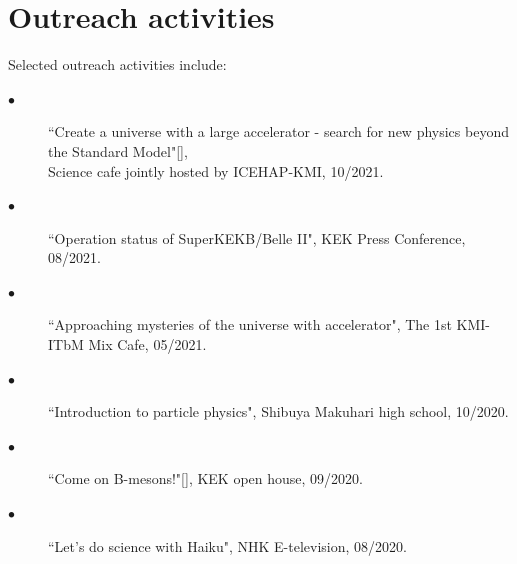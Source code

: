 \documentclass[11pt]{article}
\begin{document}
\section*{\large{Outreach activities}} 
{\footnotesize
Selected outreach activities include:
\begin{description}
\item[$\bullet$]  {``Create a universe with a large accelerator - search for new physics beyond the Standard Model"[],\\ 
\hspace{-0.25in}Science cafe jointly hosted by ICEHAP-KMI, 10/2021.} 
\item[$\bullet$]  {``Operation status of SuperKEKB/Belle II", KEK Press Conference, 08/2021.} 
\item[$\bullet$]  {``Approaching mysteries of the universe with accelerator", The 1st KMI-ITbM Mix Cafe, 05/2021.} 
\item[$\bullet$]  {``Introduction to particle physics", Shibuya Makuhari high school, 10/2020.} 
\item[$\bullet$]  {``Come on B-mesons!"[], KEK open house, 09/2020.} 
\item[$\bullet$]  {``Let's do science with Haiku", NHK E-television, 08/2020.} 
\end{description}
}

\end{document}

